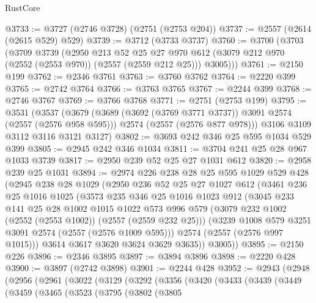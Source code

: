 \begin{lexlean}{RustCore}
\begin{coremodule}
@3733 := @3727 (@2746 @3728) (@2751 (@2753 @204))
@3737 := @2557 (@2614 (@2615 @529) @529)
@3739 := @3712 (@3733 @3737)
@3760 := @3700
    (@3703
      (@3709
        @3739
        (@2950
          @213
          @52
          @25
          @27
          @970
          @612
          (@3079 @212 @970 (@2552 (@2553 @970)) (@2557 (@2559 @212 @25)))
          @3005)))
@3761 := @2150 @199
@3762 := @2346 @3761
@3763 := @3760 @3762
@3764 := @2220 @399
@3765 := @2742 @3764
@3766 := @3763 @3765
@3767 := @2244 @399
@3768 := @2746 @3767
@3769 := @3766 @3768
@3771 := @2751 (@2753 @199)
@3795 := @3531
    (@3537
      (@3679
        (@3689 (@3692 (@3769 @3771 @3737)) @3091 @2574 (@2557 (@2576 @958 @595)))
        @2574
        (@2557 (@2576 @877 @978)))
      @3106
      @3109
      @3112
      @3116
      @3121
      @3127)
@3802 := @3693 @242 @346 @25 @595 @1034 @529 @399
@3805 := @2945 @242 @346 @1034
@3811 := @3704 @241 @25 @28 @967 @1033 @3739
@3817 := @2950 @239 @52 @25 @27 @1031 @612
@3820 := @2958 @239 @25 @1031
@3894 := @2974
    @226
    @238
    @28
    @25
    @595
    @1029
    @529
    @428
    (@2945
      @238
      @28
      @1029
      (@2950
        @236
        @52
        @25
        @27
        @1027
        @612
        (@3461
          @236
          @25
          @1016
          @1025
          (@3573
            @235
            @346
            @25
            @1016
            @1023
            @912
            (@3045
              @233
              @141
              @25
              @28
              @1002
              @1015
              @1022
              @573
              @996
              @579
              (@3079 @232 @1002 (@2552 (@2553 @1002)) (@2557 (@2559 @232 @25)))
              (@3239 @1008 @579 @3251 @3091 @2574 (@2557 (@2576 @1009 @595)))
              @2574
              (@2557 (@2576 @997 @1015)))
            @3614
            @3617
            @3620
            @3624
            @3629
            @3635))
        @3005))
@3895 := @2150 @226
@3896 := @2346 @3895
@3897 := @3894 @3896
@3898 := @2220 @428
@3900 := @3897 (@2742 @3898)
@3901 := @2244 @428
@3952 := @2943
    (@2948
      (@2956
        (@2961
          (@3022
            (@3129
              (@3292
                (@3356
                  (@3420
                    (@3433
                      (@3439
                        (@3449
                          (@3459
                            (@3465
                              (@3523
                                (@3795
                                  (@3802
                                    (@3805

\end{coremodule}
\end{lexlean}
